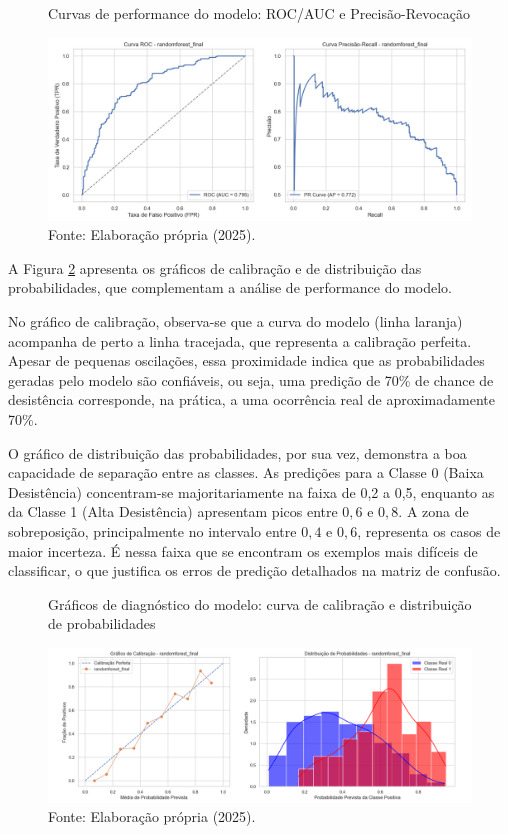 \begin{figure}[H]
    \centering
    \caption{Curvas de performance do modelo: ROC/AUC e Precisão-Revocação}
    \label{fig:perf_curves}
    \includegraphics[width=\textwidth]{fig7_performance_curves.png}
    \caption*{Fonte: Elaboração própria (2025).}
\end{figure}

A Figura \ref{fig:diag_plots} apresenta os gráficos de calibração e de distribuição das probabilidades, que complementam a análise de performance do modelo.

No gráfico de calibração, observa-se que a curva do modelo (linha laranja) acompanha de perto a linha tracejada, que representa a calibração perfeita. Apesar de pequenas oscilações, essa proximidade indica que as probabilidades geradas pelo modelo são confiáveis, ou seja, uma predição de 70\% de chance de desistência corresponde, na prática, a uma ocorrência real de aproximadamente 70\%.

O gráfico de distribuição das probabilidades, por sua vez, demonstra a boa capacidade de separação entre as classes. As predições para a Classe 0 (Baixa Desistência) concentram-se majoritariamente na faixa de 0,2 a 0,5, enquanto as da Classe 1 (Alta Desistência) apresentam picos entre $0,6\text{ e }0,8$. A zona de sobreposição, principalmente no intervalo entre $0,4\text{ e }0,6$, representa os casos de maior incerteza. É nessa faixa que se encontram os exemplos mais difíceis de classificar, o que justifica os erros de predição detalhados na matriz de confusão.

\begin{figure}[H]
    \centering
    \caption{Gráficos de diagnóstico do modelo: curva de calibração e distribuição de probabilidades}
    \label{fig:diag_plots}
    \includegraphics[width=\textwidth]{fig8_diagnostic_plots.png}
    \caption*{Fonte: Elaboração própria (2025).}
\end{figure}

